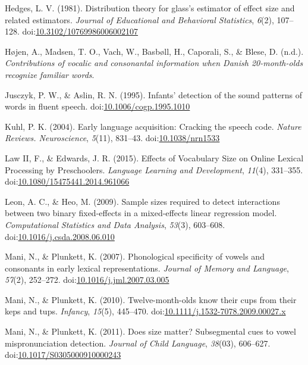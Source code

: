 \documentclass[man]{apa6}
\theoremstyle{definition}
\theoremstyle{definition}
\theoremstyle{definition}
\theoremstyle{remark}
\begin{document}
\hypertarget{ref-Hedges1981}{}
Hedges, L. V. (1981). Distribution theory for glass's estimator of
effect size and related estimators. \emph{Journal of Educational and
Behavioral Statistics}, \emph{6}(2), 107--128.
doi:\href{https://doi.org/10.3102/10769986006002107}{10.3102/10769986006002107}

\hypertarget{ref-Hojen}{}
Højen, A., Madsen, T. O., Vach, W., Basbøll, H., Caporali, S., \& Blese,
D. (n.d.). \emph{Contributions of vocalic and consonantal information
when Danish 20-month-olds recognize familiar words}.

\hypertarget{ref-Jusczyk1995}{}
Jusczyk, P. W., \& Aslin, R. N. (1995). Infants' detection of the sound
patterns of words in fluent speech.
doi:\href{https://doi.org/10.1006/cogp.1995.1010}{10.1006/cogp.1995.1010}

\hypertarget{ref-Kuhl2004}{}
Kuhl, P. K. (2004). Early language acquisition: Cracking the speech
code. \emph{Nature Reviews. Neuroscience}, \emph{5}(11), 831--43.
doi:\href{https://doi.org/10.1038/nrn1533}{10.1038/nrn1533}

\hypertarget{ref-Law2015}{}
Law II, F., \& Edwards, J. R. (2015). Effects of Vocabulary Size on
Online Lexical Processing by Preschoolers. \emph{Language Learning and
Development}, \emph{11}(4), 331--355.
doi:\href{https://doi.org/10.1080/15475441.2014.961066}{10.1080/15475441.2014.961066}

\hypertarget{ref-Leon2009}{}
Leon, A. C., \& Heo, M. (2009). Sample sizes required to detect
interactions between two binary fixed-effects in a mixed-effects linear
regression model. \emph{Computational Statistics and Data Analysis},
\emph{53}(3), 603--608.
doi:\href{https://doi.org/10.1016/j.csda.2008.06.010}{10.1016/j.csda.2008.06.010}

\hypertarget{ref-Mani2007}{}
Mani, N., \& Plunkett, K. (2007). Phonological specificity of vowels and
consonants in early lexical representations. \emph{Journal of Memory and
Language}, \emph{57}(2), 252--272.
doi:\href{https://doi.org/10.1016/j.jml.2007.03.005}{10.1016/j.jml.2007.03.005}

\hypertarget{ref-Mani2010kepstups}{}
Mani, N., \& Plunkett, K. (2010). Twelve-month-olds know their cups from
their keps and tups. \emph{Infancy}, \emph{15}(5), 445--470.
doi:\href{https://doi.org/10.1111/j.1532-7078.2009.00027.x}{10.1111/j.1532-7078.2009.00027.x}

\hypertarget{ref-Mani2011}{}
Mani, N., \& Plunkett, K. (2011). Does size matter? Subsegmental cues to
vowel mispronunciation detection. \emph{Journal of Child Language},
\emph{38}(03), 606--627.
doi:\href{https://doi.org/10.1017/S0305000910000243}{10.1017/S0305000910000243}
\end{document}
